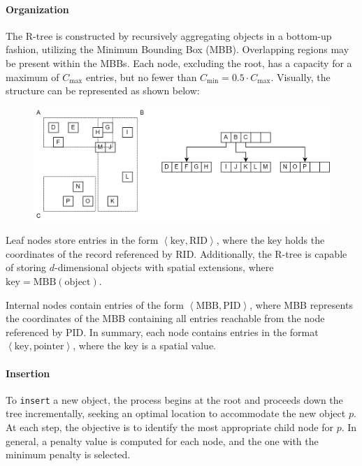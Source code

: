 \paragraph*{Organization}
The R-tree is constructed by recursively aggregating objects in a bottom-up fashion, utilizing the Minimum Bounding Box (MBB). 
Overlapping regions may be present within the MBBs. 
Each node, excluding the root, has a capacity for a maximum of $C_{\text{max}}$ entries, but no fewer than $C_{\text{min}}=0.5 \cdot C_{\text{max}}$.
Visually, the structure can be represented as shown below:
\begin{figure}[H]
    \centering
    \includegraphics[width=0.75\linewidth]{images/r.png}
\end{figure}
Leaf nodes store entries in the form $\left\langle \text{key}, \text{RID} \right\rangle$, where the key holds the coordinates of the record referenced by RID.
Additionally, the R-tree is capable of storing $d$-dimensional objects with spatial extensions, where $\text{key}=\text{MBB}(\text{object})$. 

Internal nodes contain entries of the form $\left\langle \text{MBB}, \text{PID} \right\rangle$, where MBB represents the coordinates of the MBB containing all entries reachable from the node referenced by PID. 
In summary, each node contains entries in the format $\left\langle \text{key}, \text{pointer} \right\rangle$, where the key is a spatial value.

\paragraph*{Insertion}
To \texttt{insert} a new object, the process begins at the root and proceeds down the tree incrementally, seeking an optimal location to accommodate the new object $p$. 
At each step, the objective is to identify the most appropriate child node for $p$. 
In general, a penalty value is computed for each node, and the one with the minimum penalty is selected.

